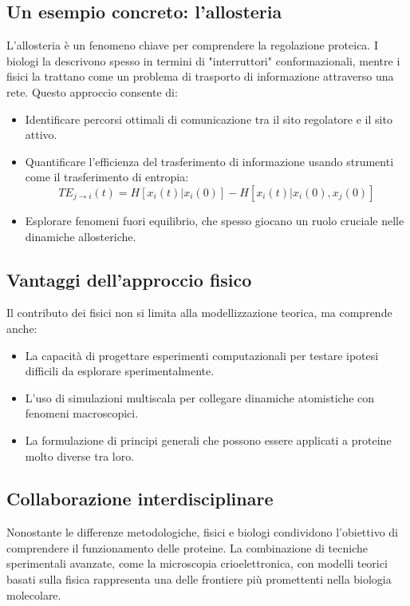 \documentclass[Lau,binding=0.6cm,oneside,noexaminfo]{sapthesis}
\begin{document}
\subsection{Un esempio concreto: l'allosteria}
L'allosteria è un fenomeno chiave per comprendere la regolazione proteica. I biologi la descrivono spesso in termini di "interruttori" conformazionali, mentre i fisici la trattano come un problema di trasporto di informazione attraverso una rete. Questo approccio consente di:
\begin{itemize}
    \item Identificare percorsi ottimali di comunicazione tra il sito regolatore e il sito attivo.
    \item Quantificare l'efficienza del trasferimento di informazione usando strumenti come il trasferimento di entropia:
    \[
    TE_{j \to i}(t) = H[x_i(t) | x_i(0)] - H[x_i(t) | x_i(0), x_j(0)]
    \]
    \item Esplorare fenomeni fuori equilibrio, che spesso giocano un ruolo cruciale nelle dinamiche allosteriche.
\end{itemize}

\subsection{Vantaggi dell'approccio fisico}
Il contributo dei fisici non si limita alla modellizzazione teorica, ma comprende anche:
\begin{itemize}
    \item La capacità di progettare esperimenti computazionali per testare ipotesi difficili da esplorare sperimentalmente.
    \item L'uso di simulazioni multiscala per collegare dinamiche atomistiche con fenomeni macroscopici.
    \item La formulazione di principi generali che possono essere applicati a proteine molto diverse tra loro.
\end{itemize}

\subsection{Collaborazione interdisciplinare}
Nonostante le differenze metodologiche, fisici e biologi condividono l'obiettivo di comprendere il funzionamento delle proteine. La combinazione di tecniche sperimentali avanzate, come la microscopia crioelettronica, con modelli teorici basati sulla fisica rappresenta una delle frontiere più promettenti nella biologia molecolare.
\end{document}
